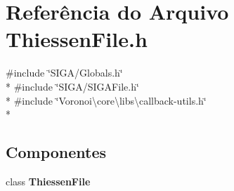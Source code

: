 \section{Referência do Arquivo Thiessen\+File.\+h}
\label{_thiessen_file_8h}
{\ttfamily \#include \char`\"{}S\+I\+G\+A/\+Globals.\+h\char`\"{}}\\*
{\ttfamily \#include \char`\"{}S\+I\+G\+A/\+S\+I\+G\+A\+File.\+h\char`\"{}}\\*
{\ttfamily \#include \char`\"{}Voronoi\textbackslash{}core\textbackslash{}libs\textbackslash{}callback-\/utils.\+h\char`\"{}}\\*
\subsection*{Componentes}
\begin{DoxyCompactItemize}
\item 
class {\bf Thiessen\+File}
\end{DoxyCompactItemize}
